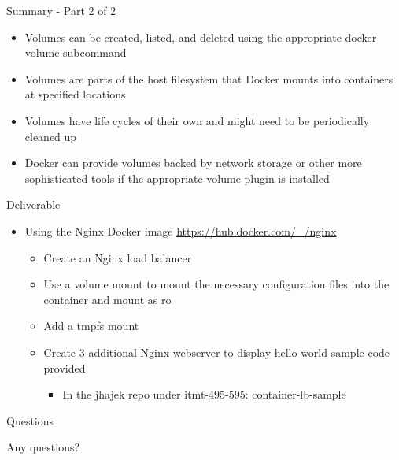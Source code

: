 \documentclass[ignorenonframetext,]{beamer}
\providecommand{\tightlist}{%
  \setlength{\itemsep}{0pt}\setlength{\parskip}{0pt}}
\begin{document}
\begin{frame}{Summary - Part 2 of 2}
\protect\hypertarget{summary---part-2-of-2}{}

\begin{itemize}
\tightlist
\item
  Volumes can be created, listed, and deleted using the appropriate
  docker volume subcommand
\item
  Volumes are parts of the host filesystem that Docker mounts into
  containers at specified locations
\item
  Volumes have life cycles of their own and might need to be
  periodically cleaned up
\item
  Docker can provide volumes backed by network storage or other more
  sophisticated tools if the appropriate volume plugin is installed
\end{itemize}

\end{frame}

\begin{frame}{Deliverable}
\protect\hypertarget{deliverable}{}

\begin{itemize}
\tightlist
\item
  Using the Nginx Docker image \url{https://hub.docker.com/_/nginx}

  \begin{itemize}
  \tightlist
  \item
    Create an Nginx load balancer
  \item
    Use a volume mount to mount the necessary configuration files into
    the container and mount as ro
  \item
    Add a tmpfs mount
  \item
    Create 3 additional Nginx webserver to display hello world sample
    code provided

    \begin{itemize}
    \tightlist
    \item
      In the jhajek repo under itmt-495-595: container-lb-sample
    \end{itemize}
  \end{itemize}
\end{itemize}

\end{frame}

\begin{frame}{Questions}
\protect\hypertarget{questions}{}

Any questions?

\end{frame}
\end{document}
